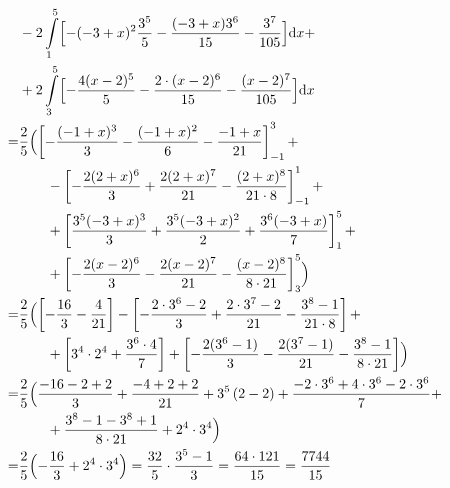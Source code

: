 {\begin{align*}
& -2\int\limits_{1}^5\Bigl[ -(-3+x)^2\frac{3^5}5- \frac{(-3+x)3^6}{15}-\frac{3^7}{105}\Bigr]\mathrm{d} x+\\
& + 2\int\limits_{3}^5\Bigl[ -\frac{4(x-2)^5}5-\frac{2 \cdot (x-2)^6}{15}-\frac{(x-2)^7}{105}\Bigr]\mathrm{d}
x\\
=&\frac 25 \Bigl( \left[-\frac{(-1+x)^3}3 - \frac{(-1+x)^2}{6} - \frac{-1+x}{21}\right]_{-1}^3 + \\
&\qquad -\left[ -\frac{2(2+x)^6}{3}  +\frac{2(2+x)^7}{21} - \frac{(2+x)^8}{21\cdot 8}\right]_{-1}^1
+ \\
&\qquad + \left[ \frac{3^5(-3+x)^3}{3} + \frac{3^5(-3+x)^2}{2} + \frac{3^6(-3+x)}{7}\right]_{1}^5+\\
&\qquad + \left[-\frac{2(x-2)^6}{3} - \frac{2(x-2)^7}{21} - \frac{(x-2)^8}{8\cdot
21}\right]_3^5\Bigr)\\
=& \frac 25 \Bigl( \left[-\frac{16}3-\frac{4}{21} \right] - \left[-\frac{2\cdot 3^6-2}3
+ \frac{2\cdot 3^7-2}{21}-\frac{3^8-1}{21\cdot 8}\right] + \\
&\qquad + \left[3^4\cdot 2^4+\frac{3^6\cdot 4}{7}\right] + \left[ -\frac{2(3^6-1)}3
- \frac{2(3^7-1)}{21}-\frac{3^8-1}{8\cdot 21}\right]\Bigr)\\
=& \frac 25 \Bigl( \frac{-16-2+2}3+\frac{-4+2+2}{21}+3^5\left( 2-2\right)+\frac{-2\cdot 3^6+4\cdot
3^6-2\cdot 3^6}{7}+\\
&\qquad + \frac{3^8-1-3^8+1}{8\cdot 21}+2^4\cdot 3^4\Bigr)\\
=& \frac 25 \Bigl( -\frac{16}3 +2^4\cdot 3^4\Bigr) = \frac{32}5\cdot \frac {3^5-1}3 = \frac{64\cdot 121}{15}=\frac{7744}{15}
\end{align*}

}
